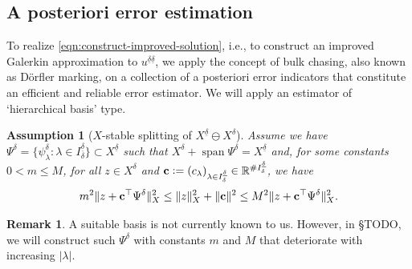 \documentclass[11pt,a4paper,oneside,english]{amsart}
\numberwithin{equation}{section}
\numberwithin{theorem}{section}
\newtheorem{assum}[theorem]{Assumption}
\theoremstyle{definition}
\newtheorem{remark}[theorem]{Remark}
\newcommand{\R}{\mathbb{R}}
\DeclareMathOperator{\spann}{span}
\newcommand{\udelta}{{\underline{\delta}}}
\newcommand{\jw}[1]{{\color{red}{JW: #1}}}
\begin{document}
\subsection{A posteriori error estimation}
To realize \eqref{eqn:construct-improved-solution}, i.e., to construct an improved
Galerkin approximation to $u^{\udelta \udelta}$, we apply the concept of bulk
chasing, also known as D\"{o}rfler marking, on a collection of a posteriori error
indicators that constitute an efficient and reliable error estimator. We will apply
an estimator of `hierarchical basis' type.  

\begin{assum}[$X$-stable splitting of $X^{\udelta} \ominus X^\delta$]
  \jw{is dit een juiste naam voor deze assumption?}
  Assume we have $\Psi^\delta=\{\psi^\delta_\lambda\colon \lambda \in I_\delta^\udelta\} \subset X^\udelta$
  such that $X^\delta + \spann \Psi^\delta=X^\udelta$ and, for some constants $0<m\leq M$,
  for all $z \in X^\delta$ and ${\bf c} := (c_\lambda)_{\lambda \in I_\delta^\udelta} \in \R^{\# I_\delta^\udelta}$, we have
  \begin{equation}
    m^2 \|z+{\bf c}^\top \Psi^\delta\|_X^2 
    \leq \|z\|_X^2+\|{\bf c}\|^2
    \leq M^2 \|z+{\bf c}^\top \Psi^\delta\|_X^2.
  \label{eqn:X-stable-splitting}
  \end{equation}
  \label{assum:X-stable-splitting}
\end{assum}
\begin{remark}
  A suitable basis is not currently known to us. However, in \S TODO, we will construct
  such $\Psi^\delta$ with constants $m$ and $M$ that deteriorate with increasing $|\lambda|$.
  \jw{is die constructie iets dat we misschien in een appendix willen zetten?}
\end{remark}
\end{document}
